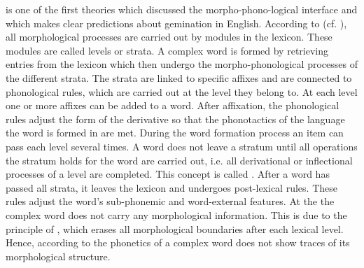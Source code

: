  is one of the first theories which discussed the morpho-phono-logical interface and which makes clear predictions about {gemination} in English. According to  (cf. \citealt{Kiparsky.1982,Mohanan.1986}), all morphological processes are carried out by modules in the lexicon. These modules are called levels or strata. A complex word is formed by retrieving entries from the lexicon which then undergo the morpho-phonological processes of the different strata. The strata are linked to specific affixes and are connected to phonological rules, which are carried out at the level they belong to. At each level one or more affixes can be added to a word. After affixation, the phonological rules adjust the form of the derivative so that the phonotactics of the language the word is formed in are met. During the word formation process an item can pass each level several times. A word does not leave a stratum until all operations the stratum holds for the word are carried out, i.e. all derivational or inflectional processes of a level are completed. This concept is called . After a word has passed all strata, it leaves the lexicon and undergoes post-lexical rules. These rules adjust the word's sub-phonemic and word-external features. 
At the  the complex word does not carry any morphological information.  This is due to the principle of , which erases all morphological boundaries after each lexical level. Hence, according to  the phonetics of a complex word does not show traces of its morphological structure.

